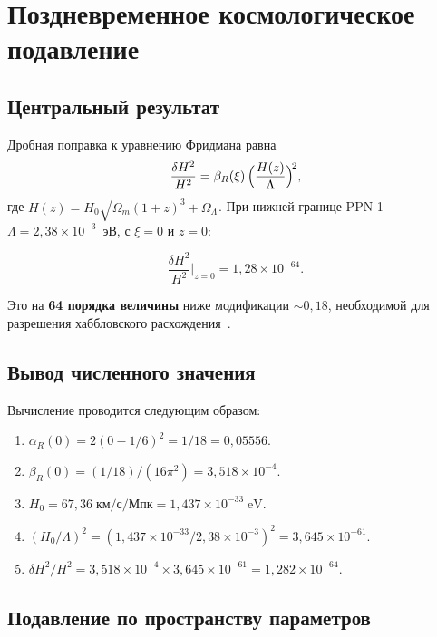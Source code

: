 \documentclass[12pt,a4paper]{article}
\newcommand{\Lam}{\Lambda}
\theoremstyle{plain}
\theoremstyle{definition}
\begin{document}
\section{Поздневременное космологическое подавление}
\label{sec:late-time}

\subsection{Центральный результат}

Дробная поправка к уравнению Фридмана равна
\begin{equation}\label{eq:suppression}
  \frac{\delta H^2}{H^2}
  = \beta_R(\xi)\,\Bigl(\frac{H(z)}{\Lam}\Bigr)^{\!2},
\end{equation}
где $H(z) = H_0\sqrt{\Omega_m(1+z)^3 + \Omega_\Lam}$.  При нижней
границе PPN-1 $\Lam = 2{,}38 \times 10^{-3}$~эВ, с $\xi = 0$ и $z = 0$:

\begin{equation}\label{eq:central-suppression}
  \boxed{
  \frac{\delta H^2}{H^2}\bigg|_{z=0}
  = 1{,}28 \times 10^{-64}.
  }
\end{equation}

Это на \textbf{64 порядка величины} ниже модификации $\sim 0{,}18$,
необходимой для разрешения хаббловского
расхождения~\cite{Planck:2018vyg}.

\subsection{Вывод численного значения}

Вычисление проводится следующим образом:
\begin{enumerate}[nosep]
  \item $\alpha_R(0) = 2(0 - 1/6)^2 = 1/18 = 0{,}05556$.
  \item $\beta_R(0) = (1/18)/(16\pi^2) = 3{,}518 \times 10^{-4}$.
  \item $H_0 = 67{,}36\;\text{км/с/Мпк}
    = 1{,}437 \times 10^{-33}\;\mathrm{eV}$.
  \item $(H_0/\Lam)^2
    = (1{,}437 \times 10^{-33}/2{,}38 \times 10^{-3})^2
    = 3{,}645 \times 10^{-61}$.
  \item $\delta H^2/H^2 = 3{,}518 \times 10^{-4}
    \times 3{,}645 \times 10^{-61}
    = 1{,}282 \times 10^{-64}$.
\end{enumerate}

\subsection{Подавление по пространству параметров}
\end{document}
